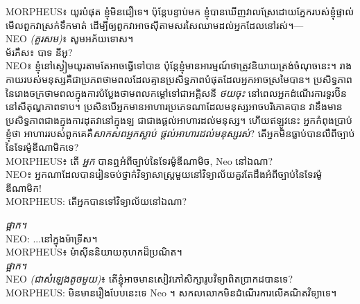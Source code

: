 
\begin{playdialog}
MORPHEUS៖ យូរបំផុត ខ្ញុំមិនជឿទេ។ ប៉ុន្តែបន្ទាប់មក ខ្ញុំបានឃើញវាលស្រែដោយភ្នែករបស់ខ្ញុំផ្ទាល់ មើលពួកវាស្រក់ទឹកមាត់ ដើម្បីឲ្យពួកវាអាចស៊ីតាមសរសៃឈាមដល់អ្នកដែលនៅរស់។—\\

NEO \emph{(គួរសម)}៖ សូមអភ័យទោស។\\

ម័រភឺស៖ បាទ នីអូ?\\

NEO៖ ខ្ញុំ​នៅ​ស្ងៀម​យូរ​តាម​តែ​អាច​ធ្វើ​ទៅ​បាន ប៉ុន្តែ​ខ្ញុំ​មាន​អារម្មណ៍​ថា​ត្រូវ​និយាយ​ត្រង់​ចំណុច​នេះ។ រាងកាយរបស់មនុស្សគឺជាប្រភពថាមពលដែលគ្មានប្រសិទ្ធភាពបំផុតដែលអ្នកអាចស្រមៃបាន។ ប្រសិទ្ធភាពនៃរោងចក្រថាមពលក្នុងការបំប្លែងថាមពលកម្ដៅទៅជាអគ្គិសនី \emph{ថយចុះ} នៅពេលអ្នកដំណើរការទួរប៊ីននៅសីតុណ្ហភាពទាប។ ប្រសិនបើអ្នកមានអាហារប្រភេទណាដែលមនុស្សអាចបរិភោគបាន វានឹងមានប្រសិទ្ធភាពជាងក្នុងការដុតវានៅក្នុងឡ ជាជាងផ្តល់អាហារដល់មនុស្ស។ ហើយឥឡូវនេះ អ្នកកំពុងប្រាប់ខ្ញុំថា អាហាររបស់ពួកគេគឺ\emph{សាកសពអ្នកស្លាប់ ផ្តល់អាហារដល់មនុស្សរស់}? តើអ្នកមិនធ្លាប់បានលឺពីច្បាប់នៃទែរម៉ូឌីណាមិកទេ?\\

MORPHEUS៖ តើ \emph{អ្នក} បានឮអំពីច្បាប់នៃទែរម៉ូឌីណាមិច, Neo នៅឯណា?\\

NEO៖ អ្នក​ណា​ដែល​បាន​រៀន​ចប់​ថ្នាក់​វិទ្យាសាស្ត្រ​មួយ​នៅ​វិទ្យាល័យ​គួរ​តែ​ដឹង​អំពី​ច្បាប់​នៃ​ទែរម៉ូឌីណាមិក!\\

MORPHEUS: តើអ្នកបានទៅវិទ្យាល័យនៅឯណា?

\emph{ផ្អាក។}\\

NEO: ...នៅក្នុងម៉ាទ្រីស។\\

MORPHEUS៖ ម៉ាស៊ីននិយាយកុហកដ៏ប្រណិត។\\

\emph{ផ្អាក។}\\

NEO \emph{(ជាសំឡេងតូចមួយ)}៖ តើខ្ញុំអាចមានសៀវភៅសិក្សារូបវិទ្យាពិតប្រាកដបានទេ?\\

MORPHEUS: មិនមានរឿងបែបនេះទេ Neo ។ សកលលោកមិនដំណើរការលើគណិតវិទ្យាទេ។\\
\end{playdialog}

